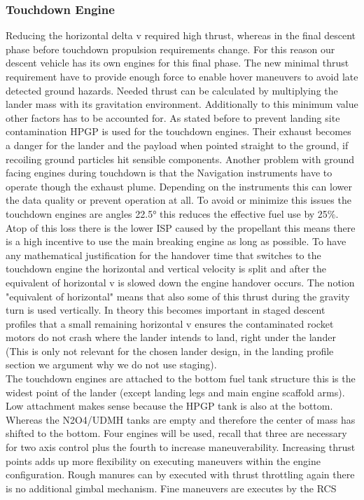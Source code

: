 \subsubsection{Touchdown Engine} 
Reducing the horizontal delta v required high thrust, whereas in the final descent phase before touchdown propulsion requirements change. For this reason our descent vehicle has its own engines for this final phase. The new minimal thrust requirement have to provide enough force to enable hover maneuvers to avoid late detected ground hazards. Needed thrust can be calculated by multiplying the lander mass with its gravitation environment. Additionally to this minimum value other factors has to be accounted for. As stated before to prevent landing site contamination HPGP is used for the touchdown engines. Their exhaust becomes a danger for the lander and the payload when pointed straight to the ground, if recoiling ground particles hit sensible components. Another problem with ground facing engines during touchdown is that the Navigation instruments have to operate though the exhaust plume. Depending on the instruments this can lower the data quality or prevent operation at all. To avoid or minimize this issues the touchdown engines are angles 22.5° this reduces the effective fuel use by 25\%. Atop of this loss there is the lower ISP caused by the propellant this means there is a high incentive to use the main breaking engine as long as possible. To have any mathematical justification for the handover time that switches to the touchdown engine the horizontal and vertical velocity is split and after the equivalent of horizontal v is slowed down the engine handover occurs. The notion "equivalent of horizontal" means that also some of this thrust during the gravity turn is used vertically. In theory this becomes important in staged descent profiles that a small remaining horizontal v ensures the contaminated rocket motors do not crash where the lander intends to land, right under the lander (This is only not relevant for the chosen lander design, in the landing profile section we argument why we do not use staging).\\
The touchdown engines are attached to the bottom fuel tank structure this is the widest point of the lander (except landing legs and main engine scaffold arms). Low attachment makes sense because the HPGP tank is also at the bottom. Whereas the N2O4/UDMH tanks are empty and therefore the center of mass has shifted to the bottom. Four engines will be used, recall that three are necessary for two axis control plus the fourth to increase maneuverability. Increasing thrust points adds up more flexibility on executing maneuvers within the engine configuration. Rough manures can by executed with thrust throttling again there is no additional gimbal mechanism. Fine maneuvers are executes by the RCS\\

